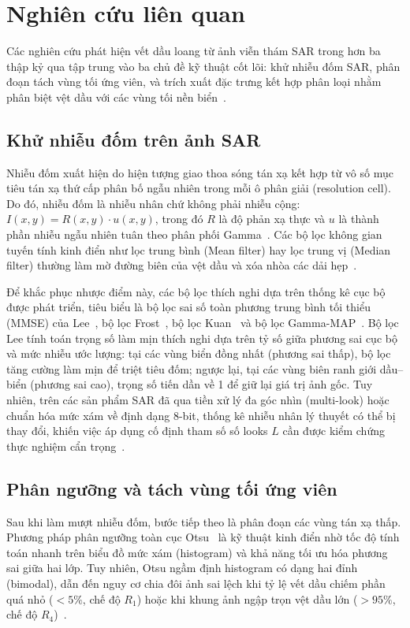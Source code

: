 \section{Nghiên cứu liên quan}
\label{sec:related_work}

Các nghiên cứu phát hiện vết dầu loang từ ảnh viễn thám SAR trong hơn ba thập kỷ qua tập trung vào ba chủ đề kỹ thuật cốt lõi: khử nhiễu đốm SAR, phân đoạn tách vùng tối ứng viên, và trích xuất đặc trưng kết hợp phân loại nhằm phân biệt vệt dầu với các vùng tối nền biển~\cite{fingas2014review,brekke2005oil}.

\subsection{Khử nhiễu đốm trên ảnh SAR}
Nhiễu đốm xuất hiện do hiện tượng giao thoa sóng tán xạ kết hợp từ vô số mục tiêu tán xạ thứ cấp phân bố ngẫu nhiên trong mỗi ô phân giải (resolution cell). Do đó, nhiễu đốm là nhiễu nhân chứ không phải nhiễu cộng: $I(x, y) = R(x, y) \cdot u(x, y)$, trong đó $R$ là độ phản xạ thực và $u$ là thành phần nhiễu ngẫu nhiên tuân theo phân phối Gamma~\cite{lee1980digital}. Các bộ lọc không gian tuyến tính kinh điển như lọc trung bình (Mean filter) hay lọc trung vị (Median filter) thường làm mờ đường biên của vệt dầu và xóa nhòa các dải hẹp~\cite{fingas2014review}.

Để khắc phục nhược điểm này, các bộ lọc thích nghi dựa trên thống kê cục bộ được phát triển, tiêu biểu là bộ lọc sai số toàn phương trung bình tối thiểu (MMSE) của Lee~\cite{lee1980digital}, bộ lọc Frost~\cite{frost1982model}, bộ lọc Kuan~\cite{kuan1985adaptive} và bộ lọc Gamma-MAP~\cite{lopes1990structure}. Bộ lọc Lee tính toán trọng số làm mịn thích nghi dựa trên tỷ số giữa phương sai cục bộ và mức nhiễu ước lượng: tại các vùng biển đồng nhất (phương sai thấp), bộ lọc tăng cường làm mịn để triệt tiêu đốm; ngược lại, tại các vùng biên ranh giới dầu--biển (phương sai cao), trọng số tiến dần về 1 để giữ lại giá trị ảnh gốc. Tuy nhiên, trên các sản phẩm SAR đã qua tiền xử lý đa góc nhìn (multi-look) hoặc chuẩn hóa mức xám về định dạng 8-bit, thống kê nhiễu nhân lý thuyết có thể bị thay đổi, khiến việc áp dụng cố định tham số số looks $L$ cần được kiểm chứng thực nghiệm cẩn trọng~\cite{brekke2005oil}.

\subsection{Phân ngưỡng và tách vùng tối ứng viên}
Sau khi làm mượt nhiễu đốm, bước tiếp theo là phân đoạn các vùng tán xạ thấp. Phương pháp phân ngưỡng toàn cục Otsu~\cite{otsu1979threshold} là kỹ thuật kinh điển nhờ tốc độ tính toán nhanh trên biểu đồ mức xám (histogram) và khả năng tối ưu hóa phương sai giữa hai lớp. Tuy nhiên, Otsu ngầm định histogram có dạng hai đỉnh (bimodal), dẫn đến nguy cơ chia đôi ảnh sai lệch khi tỷ lệ vết dầu chiếm phần quá nhỏ ($< 5\%$, chế độ $R_1$) hoặc khi khung ảnh ngập trọn vệt dầu lớn ($> 95\%$, chế độ $R_4$)~\cite{solberg2007oil}.

